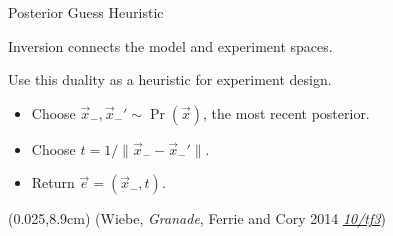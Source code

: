 \documentclass[xcolor=dvipsnames, compress]{beamer}
\renewcommand\UrlFont{\color{red}\rmfamily\itshape}
\newcommand{\shortdoi}[1]{\href{http://doi.org/#1}{\UrlFont 10/#1}}
\newcommand{\ee}{\mathrm{e}}
\newcommand{\ii}{\mathrm{i}}
\newcommand{\bottomnote}[1]{
  \begin{textblock*}{0.95\paperwidth} (0.025\paperwidth,8.9cm)
    {\tiny \hfill #1}
  \end{textblock*}
}
\begin{document}

\begin{frame}{Posterior Guess Heuristic}
 
    Inversion connects the model and experiment spaces.

    Use this duality as a heuristic for experiment design.
    
    \begin{itemize}
     \item Choose $\vec{x}_-, \vec{x}_-' \sim \Pr(\vec{x})$, the most recent posterior.
     \item Choose $t = 1 / \|\vec{x}_- - \vec{x}_-'\|$.
     \item Return $\vec{e} = (\vec{x}_-, t)$.
    \end{itemize}

  \bottomnote{(Wiebe, \emph{Granade}, Ferrie and Cory 2014 \shortdoi{tf3})}

 
\end{frame}
\end{document}
